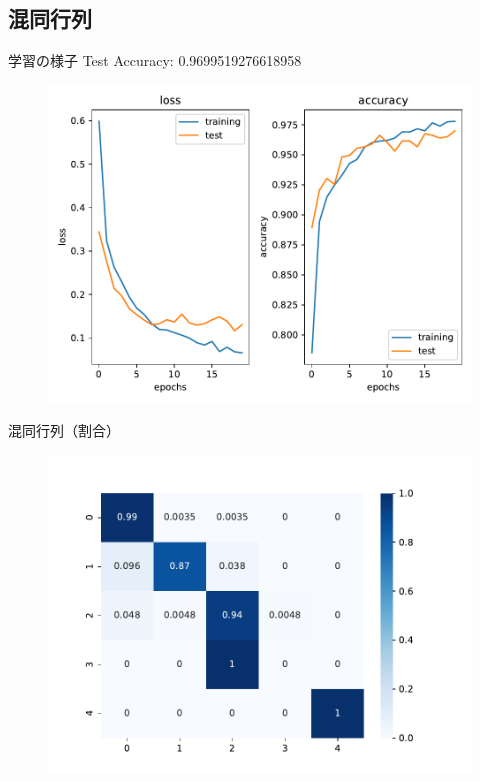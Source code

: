 \documentclass{beamer}
\begin{document}
  \begin{frame}
    \section{混同行列}
  \end{frame}

  \begin{frame}{学習の様子}
    Test Accuracy: 0.9699519276618958
    \begin{figure}[H]
      \centering
      \includegraphics[keepaspectratio, scale=0.5]{images/deep_conv.pdf}
    \end{figure}
  \end{frame}

  \begin{frame}{混同行列（割合）}
    \begin{figure}
      \centering
      \includegraphics[keepaspectratio, scale=0.6]{images/deep_conv_heatmap.pdf}
      \label{fig:heatmap}
    \end{figure}
  \end{frame}
\end{document}
